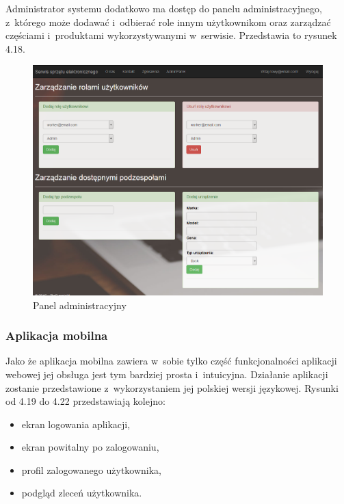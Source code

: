\documentclass[a4paper,11pt]{article}
\begin{document}
Administrator systemu dodatkowo ma dostęp do panelu administracyjnego, z~którego może dodawać i~odbierać role innym użytkownikom oraz zarządzać częściami i~produktami wykorzystywanymi w~serwisie. Przedstawia to rysunek 4.18.

\begin{figure}[H]
	\centering
	\includegraphics[width=\textwidth,height=0.6\textheight]{serwisAdmin.png}
	\caption{Panel administracyjny}
\end{figure}

\subsubsection{Aplikacja mobilna}
Jako że aplikacja mobilna zawiera w~sobie tylko część funkcjonalności aplikacji webowej jej obsługa jest tym bardziej prosta i~intuicyjna. Działanie aplikacji zostanie przedstawione z~wykorzystaniem jej polskiej wersji językowej. Rysunki od 4.19 do 4.22 przedstawiają kolejno:
\begin{itemize}
	\item ekran logowania aplikacji,
	\item ekran powitalny po zalogowaniu,
	\item profil zalogowanego użytkownika,
	\item podgląd zleceń użytkownika.
\end{itemize}
\end{document}
